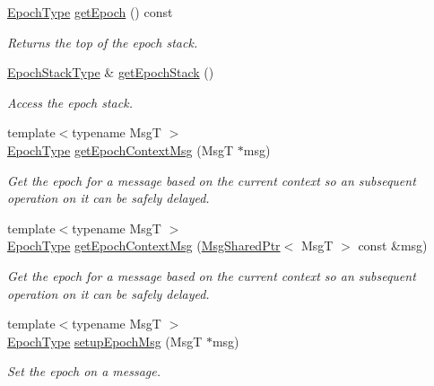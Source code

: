\begin{DoxyCompactItemize}
\hyperlink{namespacevt_a81d11b28122d43bf9834577e4a06440f}{Epoch\+Type} \hyperlink{structvt_1_1messaging_1_1_active_messenger_a627a8b2918ad283edf386038cf5693ca}{get\+Epoch} () const
\begin{DoxyCompactList}\small\item\em Returns the top of the epoch stack. \end{DoxyCompactList}\item 
\hyperlink{structvt_1_1messaging_1_1_active_messenger_a746358029c37dabf2b4c8ad26642aee9}{Epoch\+Stack\+Type} \& \hyperlink{structvt_1_1messaging_1_1_active_messenger_ab8a39ba3f4bf5ed737fb69cb2e448456}{get\+Epoch\+Stack} ()
\begin{DoxyCompactList}\small\item\em Access the epoch stack. \end{DoxyCompactList}\item 
{\footnotesize template$<$typename MsgT $>$ }\\\hyperlink{namespacevt_a81d11b28122d43bf9834577e4a06440f}{Epoch\+Type} \hyperlink{structvt_1_1messaging_1_1_active_messenger_aa60710a2d4a1ac7fe60113fd8cbb9809}{get\+Epoch\+Context\+Msg} (MsgT $\ast$msg)
\begin{DoxyCompactList}\small\item\em Get the epoch for a message based on the current context so an subsequent operation on it can be safely delayed. \end{DoxyCompactList}\item 
{\footnotesize template$<$typename MsgT $>$ }\\\hyperlink{namespacevt_a81d11b28122d43bf9834577e4a06440f}{Epoch\+Type} \hyperlink{structvt_1_1messaging_1_1_active_messenger_a66c64223357aa92f45a4a4042bd63a5f}{get\+Epoch\+Context\+Msg} (\hyperlink{structvt_1_1messaging_1_1_msg_shared_ptr}{Msg\+Shared\+Ptr}$<$ MsgT $>$ const \&msg)
\begin{DoxyCompactList}\small\item\em Get the epoch for a message based on the current context so an subsequent operation on it can be safely delayed. \end{DoxyCompactList}\item 
{\footnotesize template$<$typename MsgT $>$ }\\\hyperlink{namespacevt_a81d11b28122d43bf9834577e4a06440f}{Epoch\+Type} \hyperlink{structvt_1_1messaging_1_1_active_messenger_a7b5a8fc73617491423bf68c4fbe1e2a2}{setup\+Epoch\+Msg} (MsgT $\ast$msg)
\begin{DoxyCompactList}\small\item\em Set the epoch on a message. \end{DoxyCompactList}\item 

\end{DoxyCompactItemize}
